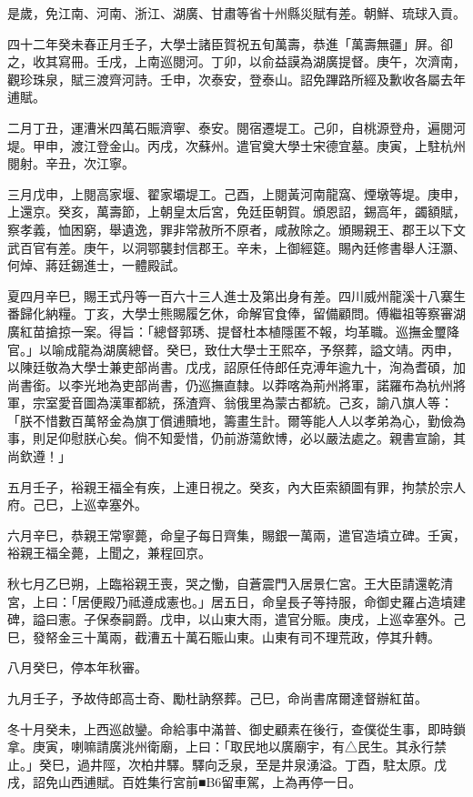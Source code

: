 \begin{pinyinscope}
是歲，免江南、河南、浙江、湖廣、甘肅等省十州縣災賦有差。朝鮮、琉球入貢。

四十二年癸未春正月壬子，大學士諸臣賀祝五旬萬壽，恭進「萬壽無疆」屏。卻之，收其寫冊。壬戌，上南巡閱河。丁卯，以俞益謨為湖廣提督。庚午，次濟南，觀珍珠泉，賦三渡齊河詩。壬申，次泰安，登泰山。詔免蹕路所經及歉收各屬去年逋賦。

二月丁丑，運漕米四萬石賑濟寧、泰安。閱宿遷堤工。己卯，自桃源登舟，遍閱河堤。甲申，渡江登金山。丙戌，次蘇州。遣官奠大學士宋德宜墓。庚寅，上駐杭州閱射。辛丑，次江寧。

三月戊申，上閱高家堰、翟家壩堤工。己酉，上閱黃河南龍窩、煙墩等堤。庚申，上還京。癸亥，萬壽節，上朝皇太后宮，免廷臣朝賀。頒恩詔，錫高年，蠲額賦，察孝義，恤困窮，舉遺逸，罪非常赦所不原者，咸赦除之。頒賜親王、郡王以下文武百官有差。庚午，以洞鄂襲封信郡王。辛未，上御經筵。賜內廷修書舉人汪灝、何焯、蔣廷錫進士，一體殿試。

夏四月辛巳，賜王式丹等一百六十三人進士及第出身有差。四川威州龍溪十八寨生番歸化納糧。丁亥，大學士熊賜履乞休，命解官食俸，留備顧問。傅繼祖等察審湖廣紅苗搶掠一案。得旨：「總督郭琇、提督杜本植隱匿不報，均革職。巡撫金璽降官。」以喻成龍為湖廣總督。癸巳，致仕大學士王熙卒，予祭葬，謚文靖。丙申，以陳廷敬為大學士兼吏部尚書。戊戌，詔原任侍郎任克溥年逾九十，洵為耆碩，加尚書銜。以李光地為吏部尚書，仍巡撫直隸。以莽喀為荊州將軍，諾羅布為杭州將軍，宗室愛音圖為漢軍都統，孫渣齊、翁俄里為蒙古都統。己亥，諭八旗人等：「朕不惜數百萬帑金為旗丁償逋贖地，籌畫生計。爾等能人人以孝弟為心，勤儉為事，則足仰慰朕心矣。倘不知愛惜，仍前游蕩飲博，必以嚴法處之。親書宣諭，其尚欽遵！」

五月壬子，裕親王福全有疾，上連日視之。癸亥，內大臣索額圖有罪，拘禁於宗人府。己巳，上巡幸塞外。

六月辛巳，恭親王常寧薨，命皇子每日齊集，賜銀一萬兩，遣官造墳立碑。壬寅，裕親王福全薨，上聞之，兼程回京。

秋七月乙巳朔，上臨裕親王喪，哭之慟，自蒼震門入居景仁宮。王大臣請還乾清宮，上曰：「居便殿乃祗遵成憲也。」居五日，命皇長子等持服，命御史羅占造墳建碑，謚曰憲。子保泰嗣爵。戊申，以山東大雨，遣官分賑。庚戌，上巡幸塞外。己巳，發帑金三十萬兩，截漕五十萬石賑山東。山東有司不理荒政，停其升轉。

八月癸巳，停本年秋審。

九月壬子，予故侍郎高士奇、勵杜訥祭葬。己巳，命尚書席爾達督辦紅苗。

冬十月癸未，上西巡啟鑾。命給事中滿普、御史顧素在後行，查僕從生事，即時鎖拿。庚寅，喇嘛請廣洮州衛廟，上曰：「取民地以廣廟宇，有△民生。其永行禁止。」癸巳，過井陘，次柏井驛。驛向乏泉，至是井泉湧溢。丁酉，駐太原。戊戌，詔免山西逋賦。百姓集行宮前■B6留車駕，上為再停一日。


\end{pinyinscope}
